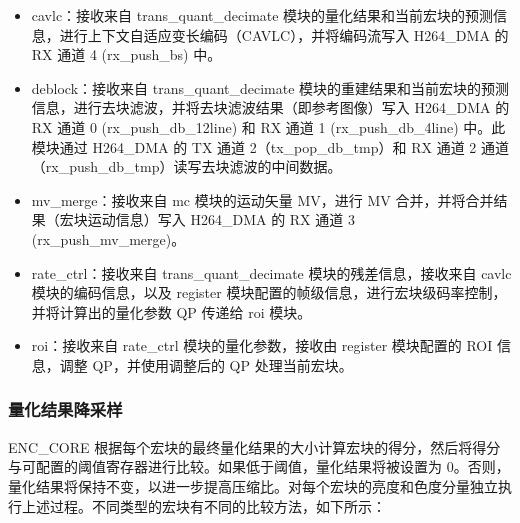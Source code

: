 \documentclass[main\_\_CN.tex]{subfiles}
\begin{document}
\begin{itemize}
    \item cavlc：接收来自 trans\_quant\_decimate 模块的量化结果和当前宏块的预测信息，进行上下文自适应变长编码（CAVLC），并将编码流写入 H264\_DMA 的 RX 通道 4 (rx\_push\_bs) 中。
    \item deblock：接收来自 trans\_quant\_decimate 模块的重建结果和当前宏块的预测信息，进行去块滤波，并将去块滤波结果（即参考图像）写入 H264\_DMA 的 RX 通道 0 (rx\_push\_db\_12line) 和 RX 通道 1 (rx\_push\_db\_4line) 中。此模块通过 H264\_DMA 的 TX 通道 2（tx\_pop\_db\_tmp）和 RX 通道 2 通道（rx\_push\_db\_tmp）读写去块滤波的中间数据。
    \item mv\_merge：接收来自 mc 模块的运动矢量 MV，进行 MV 合并，并将合并结果（宏块运动信息）写入 H264\_DMA 的 RX 通道 3 (rx\_push\_mv\_merge)。
    \item rate\_ctrl：接收来自 trans\_quant\_decimate 模块的残差信息，接收来自 cavlc 模块的编码信息，以及 register 模块配置的帧级信息，进行宏块级码率控制，并将计算出的量化参数 QP 传递给 roi 模块。
    \item roi：接收来自 rate\_ctrl 模块的量化参数，接收由 register 模块配置的 ROI 信息，调整 QP，并使用调整后的 QP 处理当前宏块。
\end{itemize}



\subsubsection{量化结果降采样}\label{sec:h264-decimate}
ENC\_CORE 根据每个宏块的最终量化结果的大小计算宏块的得分，然后将得分与可配置的阈值寄存器进行比较。如果低于阈值，量化结果将被设置为 0。否则，量化结果将保持不变，以进一步提高压缩比。对每个宏块的亮度和色度分量独立执行上述过程。不同类型的宏块有不同的比较方法，如下所示：
\end{document}
